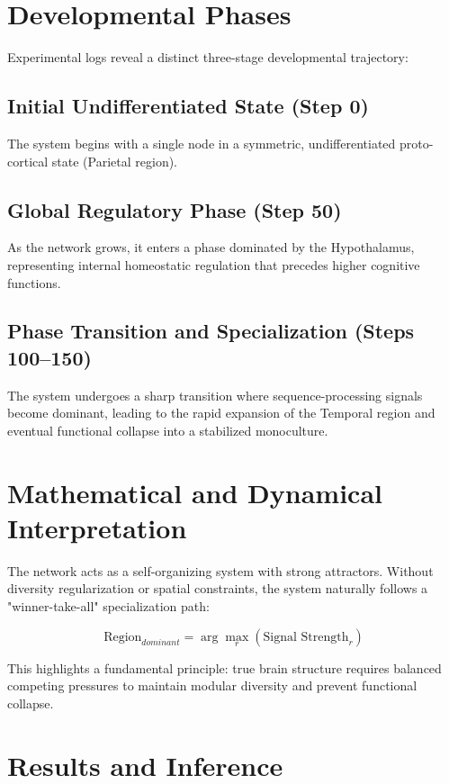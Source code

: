 \documentclass[12pt]{article}
\begin{document}
\section{Developmental Phases}

Experimental logs reveal a distinct three-stage developmental trajectory:

\subsection{Initial Undifferentiated State (Step 0)}
The system begins with a single node in a symmetric, undifferentiated proto-cortical state (Parietal region).

\subsection{Global Regulatory Phase (Step 50)}
As the network grows, it enters a phase dominated by the Hypothalamus, representing internal homeostatic regulation that precedes higher cognitive functions.

\subsection{Phase Transition and Specialization (Steps 100--150)}
The system undergoes a sharp transition where sequence-processing signals become dominant, leading to the rapid expansion of the Temporal region and eventual functional collapse into a stabilized monoculture.

\section{Mathematical and Dynamical Interpretation}

The network acts as a self-organizing system with strong attractors. Without diversity regularization or spatial constraints, the system naturally follows a "winner-take-all" specialization path:

\[
\text{Region}_{dominant} = \arg\max_{r} (\text{Signal Strength}_r)
\]

This highlights a fundamental principle: true brain structure requires balanced competing pressures to maintain modular diversity and prevent functional collapse.

\section{Results and Inference}
\end{document}
